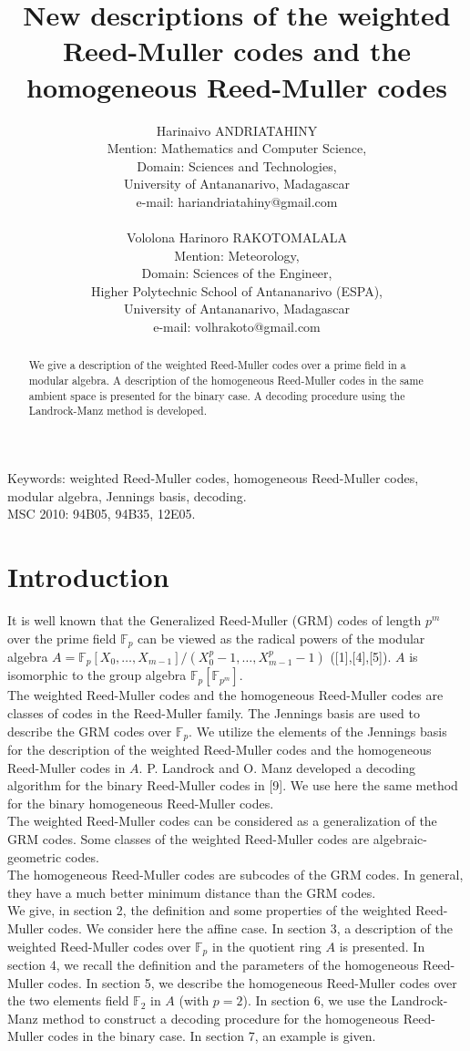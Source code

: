\documentclass{article}
\title{New descriptions of the weighted Reed-Muller codes and the homogeneous Reed-Muller codes}
\author{Harinaivo ANDRIATAHINY\\Mention: Mathematics and Computer Science,\\Domain: Sciences and Technologies,\\University of Antananarivo, Madagascar\\e-mail: hariandriatahiny@gmail.com\\\\Vololona Harinoro RAKOTOMALALA\\Mention: Meteorology,\\Domain: Sciences of the Engineer,\\Higher Polytechnic School of Antananarivo (ESPA),\\University of Antananarivo, Madagascar\\e-mail: volhrakoto@gmail.com}
\theoremstyle{plain}
\theoremstyle{definition}
\begin{document}
\maketitle

\begin{abstract}
We give a description of the weighted Reed-Muller codes over a prime field in a modular algebra. A description of the homogeneous Reed-Muller codes in the same ambient space is presented for the binary case. A decoding procedure using the Landrock-Manz method is developed.
\end{abstract}
Keywords: weighted Reed-Muller codes, homogeneous Reed-Muller codes, modular algebra, Jennings basis, decoding.\\
MSC 2010: 94B05, 94B35, 12E05.
\section{Introduction}
It is well known that the Generalized Reed-Muller (GRM) codes of length $p^m$ over the prime field $\mathbb{F}_{p}$ can be viewed as the radical powers of the modular algebra $A=\mathbb{F}_{p}[X_{0},\ldots ,X_{m-1}]/(X_{0}^{p}-1,\ldots ,X_{m-1}^{p}-1)$ ([1],[4],[5]). $A$ is isomorphic to the group algebra $\mathbb{F}_{p}[\mathbb{F}_{p^m}]$.\\
The weighted Reed-Muller codes and the homogeneous Reed-Muller codes are classes of codes in the Reed-Muller family. The Jennings basis are used to describe the GRM codes over $\mathbb{F}_{p}$. We utilize the elements of the Jennings basis for the description of the weighted Reed-Muller codes and the homogeneous Reed-Muller codes in $A$. P. Landrock and O. Manz developed a decoding algorithm for the binary Reed-Muller codes in [9]. We use here the same method for the binary homogeneous Reed-Muller codes.\\
The weighted Reed-Muller codes can be considered as a generalization of the GRM codes. Some classes of the weighted Reed-Muller codes are algebraic-geometric codes.\\
The homogeneous Reed-Muller codes are subcodes of the GRM codes. In general, they have a much better minimum distance than the GRM codes.\\
We give, in section 2, the definition and some properties of the weighted Reed-Muller codes. We consider here the affine case. In section 3, a description of the weighted Reed-Muller codes over $\mathbb{F}_{p}$ in the quotient ring $A$ is presented. In section 4, we recall the definition and the parameters of the homogeneous Reed-Muller codes. In section 5, we describe the homogeneous Reed-Muller codes over the two elements field $\mathbb{F}_{2}$ in $A$ (with $p=2$). In section 6, we use the Landrock-Manz method to construct a decoding procedure for the homogeneous Reed-Muller codes in the binary case. In section 7, an example is given.
\end{document}
